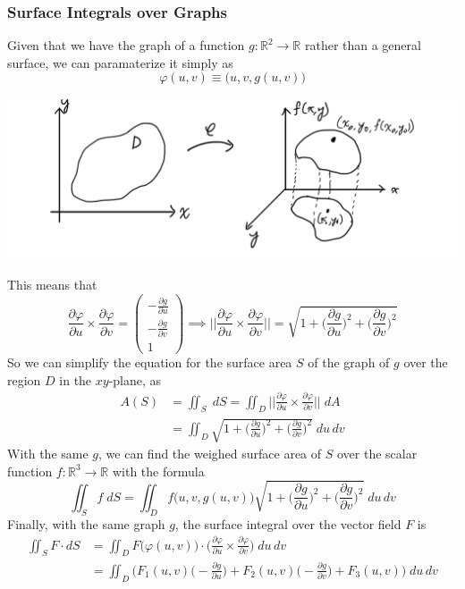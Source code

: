   \subsubsection{Surface Integrals over Graphs}
  Given that we have the graph of a function $g: \mathbb{R}^2 \longrightarrow \mathbb{R}$ rather than a general surface, we can paramaterize it simply as
  \[\varphi(u, v) \equiv \big(u, v, g(u, v) \big)\]
  \begin{center}
      \includegraphics[scale=0.25]{img/Paramaterize_Surfaces_as_Graphs.PNG}
  \end{center}
  This means that 
  \[\frac{\partial \varphi}{\partial u} \times \frac{\partial \varphi}{\partial v} = 
  \begin{pmatrix}
  -\frac{\partial g}{\partial u} \\ -\frac{\partial g}{\partial v} \\ 1
  \end{pmatrix} \implies \bigg|\bigg|\frac{\partial \varphi}{\partial u} \times \frac{\partial \varphi}{\partial v} \bigg|\bigg| = \sqrt{1 + \Big(\frac{\partial g}{\partial u}\Big)^2 + \Big( \frac{\partial g}{\partial v}\Big)^2}\]
  So we can simplify the equation for the surface area $S$ of the graph of $g$ over the region $D$ in the $x y$-plane, as 
  \begin{align*}
      A(S) & = \iint_S \; d S = \iint_D \bigg|\bigg|\frac{\partial \varphi}{\partial u} \times \frac{\partial \varphi}{\partial v} \bigg|\bigg| \; d A \\
      & = \iint_D \sqrt{1 + \Big(\frac{\partial g}{\partial u}\Big)^2 + \Big( \frac{\partial g}{\partial v}\Big)^2} \; d u \, d v
  \end{align*}
  With the same $g$, we can find the weighed surface area of $S$ over the scalar function $f: \mathbb{R}^3 \longrightarrow \mathbb{R}$ with the formula
  \[\iint_S f \; d S = \iint_D f\big(u, v, g(u, v)\big) \sqrt{1 + \Big(\frac{\partial g}{\partial u}\Big)^2 + \Big( \frac{\partial g}{\partial v}\Big)^2} \; d u \, d v\]
  Finally, with the same graph $g$, the surface integral over the vector field $F$ is
  \begin{align*}
      \iint_S F \cdot d S & = \iint_D F\big(\varphi(u, v)\big) \cdot \bigg( \frac{\partial \varphi}{\partial u} \times \frac{\partial \varphi}{\partial v}\bigg) \; d u \, d v \\
      & = \iint_D \bigg( F_1(u, v) \Big(- \frac{\partial g}{\partial u}\Big) + F_2 (u, v) \Big( - \frac{\partial g}{\partial v} \Big) + F_3 (u, v) \bigg) \; d u \, d v
  \end{align*}

